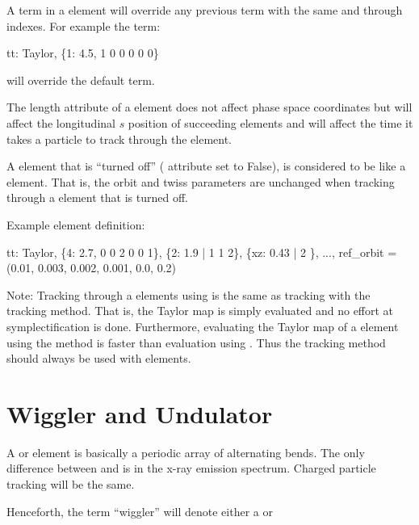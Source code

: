 {A term in a  element will override any previous term
with the same  and  through  indexes. For example the term:
\begin{example}
  tt: Taylor, \{1: 4.5, 1 0 0 0 0 0\} 
\end{example}
will override the default  term.

The  length attribute of a  element does not affect phase space
coordinates but will affect the longitudinal $s$ position of succeeding elements and will
affect the time it takes a particle to track through the element.

A  element that is ``turned off'' ( attribute set to False), is
considered to be like a  element. That is, the orbit and twiss parameters are
unchanged when tracking through a  element that is turned off.

Example  element definition:
\begin{example}
  tt: Taylor, \{4:  2.7, 0 0 2 0 0 1\}, \{2:  1.9 | 1 1 2\},
              \{xz: 0.43 | 2 \}, ..., 
              ref_orbit = (0.01, 0.003, 0.002, 0.001, 0.0, 0.2)
\end{example}

Note: Tracking through a  elements using  is the same as
tracking with the  tracking method.  That is, the Taylor map is simply
evaluated and no effort at symplectification is done. Furthermore, evaluating the Taylor
map of a  element using the  method is faster than evaluation using
. Thus the  tracking method should always be used with
 elements.


\section{Wiggler and Undulator} 
\label{s:wiggler}

A  or  element is basically a periodic array of alternating bends.
The only difference between  and  is in the x-ray emission spectrum.
Charged particle tracking will be the same. 

Henceforth, the term ``wiggler'' will denote either a  or 

}

